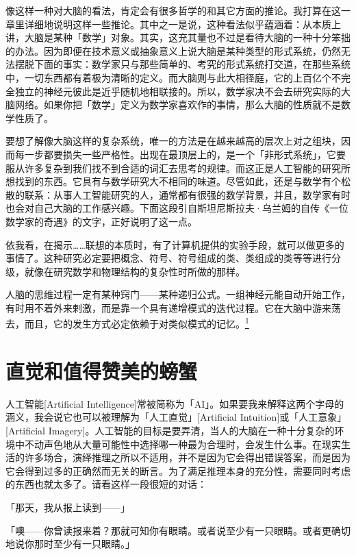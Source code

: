 \documentclass[
  12pt,
  twoside,
  openright,
  oldfontcommands,
]{memoir}
\begin{document}
像这样一种对大脑的看法，肯定会有很多哲学的和其它方面的推论。我打算在这一章里详细地说明这样一些推论。其中之一是说，这种看法似乎蕴涵着：从本质上讲，大脑是某种「数学」对象。其实，这充其量也不过是看待大脑的一种十分笨拙的办法。因为即便在技术意义或抽象意义上说大脑是某种类型的形式系统，仍然无法摆脱下面的事实：数学家只与那些简单的、考究的形式系统打交道，在那些系统中，一切东西都有着极为清晰的定义。而大脑则与此大相径庭，它的上百亿个不完全独立的神经元彼此是近乎随机地相联接的。所以，数学家决不会去研究实际的大脑网络。如果你把「数学」定义为数学家喜欢作的事情，那么大脑的性质就不是数学性质了。

要想了解像大脑这样的复杂系统，唯一的方法是在越来越高的层次上对之组块，因而每一步都要损失一些严格性。出现在最顶层上的，是一个「非形式系统」，它要服从许多复杂到我们找不到合适的词汇去思考的规律。而这正是人工智能的研究所想找到的东西。它具有与数学研究大不相同的味道。尽管如此，还是与数学有个松散的联系：从事人工智能研究的人，通常都有很强的数学背景，并且，数学家有时也会对自己大脑的工作感兴趣。下面这段引自斯坦尼斯拉夫·乌兰姆的自传《一位数学家的奇遇》的文字，正好说明了这一点。

依我看，在揭示\ldots\ldots 联想的本质时，有了计算机提供的实验手段，就可以做更多的事情了。这种研究必定要把概念、符号、符号组成的类、类组成的类等等进行分级，就像在研究数学和物理结构的复杂性时所做的那样。

人脑的思维过程一定有某种窍门------某种递归公式。一组神经元能自动开始工作，有时用不着外来剌激，而是靠一个具有递增模式的迭代过程。它在大脑中游来荡去，而且，它的发生方式必定依赖于对类似模式的记忆。\hyperref[fn:Chapter17-1]{\textsuperscript{1}}

\section{直觉和值得赞美的螃蟹}

人工智能{[}Artificial
Intelligence{]}常被简称为「AI」。如果要我来解释这两个字母的涵义，我会说它也可以被理解为「人工直觉」{[}Artificial
Intuition{]}或「人工意象」{[}Artificial
Imagery{]}。人工智能的目标是要弄清，当人的大脑在一种十分复杂的环境中不动声色地从大量可能性中选择哪一种最为合理时，会发生什么事。在现实生活的许多场合，演绎推理之所以不适用，并不是因为它会得出错误答案，而是因为它会得到过多的正确然而无关的断言。为了满足推理本身的充分性，需要同时考虑的东西也就太多了。请看这样一段很短的对话：

「那天，我从报上读到------」

「噢------你曾读报来着？那就可知你有眼睛。或者说至少有一只眼睛。或者更确切地说你那时至少有一只眼睛。」
\end{document}
